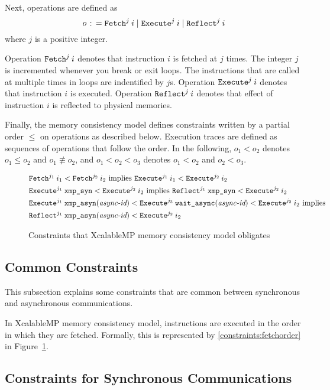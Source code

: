 Next, operations are defined as
\[
o \mathrel{\colon\!=} \texttt{Fetch}^{j} \: {i} \mid \texttt{Execute}^{j} \: {i} \mid \texttt{Reflect}^{j} \: {i}
\]
where $j$ is a positive integer.

Operation $\texttt{Fetch}^{j} \: {i}$ denotes that instruction $i$ is fetched at $j$
times.  The integer $j$ is incremented whenever you break or exit
loops.  The instructions that are called at multiple times in loops
are indentified by $j$s.  Operation $\texttt{Execute}^{j} \: {i}$ denotes that
instruction $i$ is executed.  Operation $\texttt{Reflect}^{j} \: {i}$ denotes that effect
of instruction $i$ is reflected to physical memories.

Finally, the memory consistency model defines constraints written by a
partial order $\leq$ on operations as described below.  Execution
traces are defined as sequences of operations that follow the order.
In the following, $o_1 < o_2$ denotes $o_1 \leq o_2$ and $o_1
\not\equiv o_2$, and $o_1 < o_2 < o_3$ denotes $o_1 < o_2$ and $o_2 <
o_3$.

{
\renewcommand{\theequation}{\roman{equation}}
\begin{figure}[htbp]
\begin{align}
& \texttt{Fetch}^{j_1} \: {i_1} < \texttt{Fetch}^{j_2} \: {i_2} \mbox{ implies } \texttt{Execute}^{j_1} \: {i_1} < \texttt{Execute}^{j_2} \: {i_2} \label{constraints:fetchorder}\\
& \texttt{Execute}^{j_1} \: {\texttt{xmp\_syn}} < \texttt{Execute}^{j_2} \: {i_2} \mbox{ implies } \texttt{Reflect}^{j_1} \: {\texttt{xmp\_syn}} < \texttt{Execute}^{j_2} \: {i_2} \label{constraints:synchronous}\\
& \texttt{Execute}^{j_1} \: {\texttt{xmp\_asyn}(\textit{async-id})} < \texttt{Execute}^{j_3} \: {\texttt{wait\_async}(\textit{async-id})} < \texttt{Execute}^{j_2} \: {i_2} \mbox{ implies} \nonumber\\
& \texttt{Reflect}^{j_1} \: {\texttt{xmp\_asyn}(\textit{async-id})} < \texttt{Execute}^{j_2} \: {i_2} \label{constraints:asynchronous}
\end{align}
\caption{Constraints that XcalableMP memory consistency model obligates}\label{fig:constraints}
\end{figure}
}

\subsection{Common Constraints}

This subsection explains some constraints that are common between
synchronous and asynchronous communications.

In XcalableMP memory consistency model, instructions are executed in
the order in which they are fetched.  Formally, this is represented by
\ref{constraints:fetchorder} in Figure~\ref{fig:constraints}.

\subsection{Constraints for Synchronous Communications}

